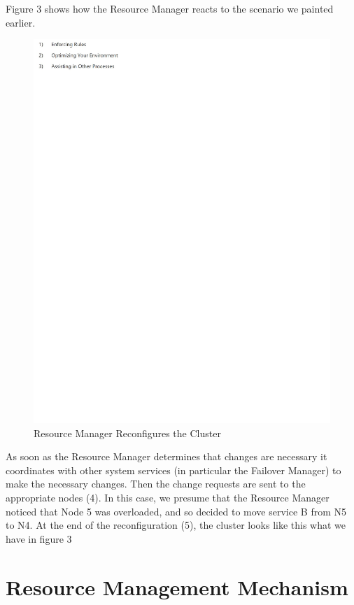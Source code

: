 Figure 3 shows how the Resource Manager reacts to the scenario we
painted earlier.

\begin{figure}[!ht]
  \centering\includegraphics[width=\columnwidth]{images/fig3.pdf}
  \caption{Resource Manager Reconfigures the Cluster}
\label{f:architecture}
\end{figure}

As soon as the Resource Manager determines that changes are necessary
it coordinates with other system services (in particular the Failover
Manager) to make the necessary changes. Then the change requests are
sent to the appropriate nodes (4). In this case, we presume that the
Resource Manager noticed that Node 5 was overloaded, and so decided to
move service B from N5 to N4. At the end of the reconfiguration (5),
the cluster looks like this what we have in figure 3

\section{Resource Management Mechanism}

